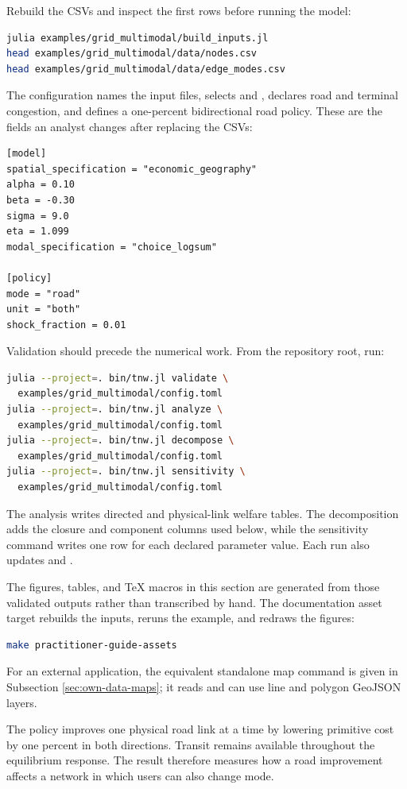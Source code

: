 Rebuild the CSVs and inspect the first rows before running the model:
\begin{lstlisting}[language=bash]
julia examples/grid_multimodal/build_inputs.jl
head examples/grid_multimodal/data/nodes.csv
head examples/grid_multimodal/data/edge_modes.csv
\end{lstlisting}
The configuration names the input files, selects
 and , declares road and terminal
congestion, and defines a one-percent bidirectional road policy. These are the
fields an analyst changes after replacing the CSVs:
\begin{lstlisting}
[model]
spatial_specification = "economic_geography"
alpha = 0.10
beta = -0.30
sigma = 9.0
eta = 1.099
modal_specification = "choice_logsum"

[policy]
mode = "road"
unit = "both"
shock_fraction = 0.01
\end{lstlisting}

Validation should precede the numerical work. From the repository root, run:
\begin{lstlisting}[language=bash]
julia --project=. bin/tnw.jl validate \
  examples/grid_multimodal/config.toml
julia --project=. bin/tnw.jl analyze \
  examples/grid_multimodal/config.toml
julia --project=. bin/tnw.jl decompose \
  examples/grid_multimodal/config.toml
julia --project=. bin/tnw.jl sensitivity \
  examples/grid_multimodal/config.toml
\end{lstlisting}
The analysis writes directed and physical-link welfare tables. The
decomposition adds the closure and component columns used below, while the
sensitivity command writes one row for each declared parameter value. Each run
also updates  and .

The figures, tables, and TeX macros in this section are generated from those
validated outputs rather than transcribed by hand. The documentation asset
target rebuilds the inputs, reruns the example, and redraws the figures:
\begin{lstlisting}[language=bash]
make practitioner-guide-assets
\end{lstlisting}
For an external application, the equivalent standalone map command is given in
Subsection \ref{sec:own-data-maps}; it reads
\code{welfare\_physical.csv} and can use line and polygon GeoJSON layers.

The policy improves one physical road link at a time by lowering primitive
cost by one percent in both directions. Transit remains available throughout
the equilibrium response. The result therefore measures how a road
improvement affects a network in which users can also change mode.

